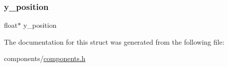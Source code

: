 \subsubsection{\texorpdfstring{y\+\_\+position}{y\_position}}
{\footnotesize\ttfamily float$\ast$ y\+\_\+position}



The documentation for this struct was generated from the following file\+:\begin{DoxyCompactItemize}
\item 
components/\mbox{\hyperlink{components_8h}{components.\+h}}\end{DoxyCompactItemize}
